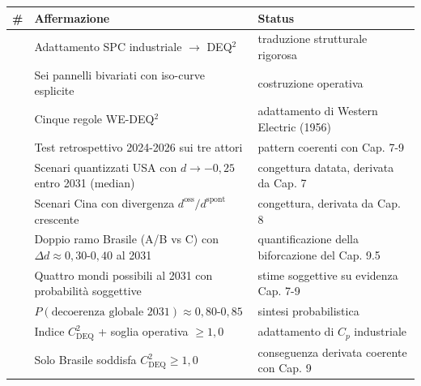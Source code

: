 {\def\LTcaptype{none} %
{\small\begin{longtable}[]{@{}
  >{\raggedright\arraybackslash}p{}
  >{\raggedright\arraybackslash}p{}
  >{\raggedright\arraybackslash}p{}@{}}
\toprule\noalign{}
\begin{minipage}[b]{\linewidth}\raggedright
\#
\end{minipage} & \begin{minipage}[b]{\linewidth}\raggedright
Affermazione
\end{minipage} & \begin{minipage}[b]{\linewidth}\raggedright
Status
\end{minipage} \\
\midrule\noalign{}
\endhead
\bottomrule\noalign{}
\endlastfoot
1 & Adattamento SPC industriale $\to$ DEQ$^2$ & \Hypoth{} traduzione
strutturale rigorosa \\
2 & Sei pannelli bivariati con iso-curve esplicite & \Hypoth{}
costruzione operativa \\
3 & Cinque regole WE-DEQ$^2$ & \Hypoth{} adattamento di Western Electric
(1956) \\
4 & Test retrospettivo 2024-2026 sui tre attori & \Proved{} pattern
coerenti con Cap. 7-9 \\
5 & Scenari quantizzati USA con \(d \to -0{,}25\) entro 2031 (median) &
\Conj{} congettura datata, derivata da Cap. 7 \\
6 & Scenari Cina con divergenza \(d^{\text{oss}}/d^{\text{spont}}\)
crescente & \Conj{} congettura, derivata da Cap. 8 \\
7 & Doppio ramo Brasile (A/B vs C) con
\(\Delta d \approx 0{,}30\)-\(0{,}40\) al 2031 & \Conj{} quantificazione
della biforcazione del Cap. 9.5 \\
8 & Quattro mondi possibili al 2031 con probabilità soggettive & \Conj{}
stime soggettive su evidenza Cap. 7-9 \\
9 & \(P(\text{decoerenza globale 2031}) \approx 0{,}80\)-\(0{,}85\) &
\Conj{} sintesi probabilistica \\
10 & Indice \(C_{\text{DEQ}}^2\) + soglia operativa \(\geq 1{,}0\) &
\Hypoth{} adattamento di \(C_p\) industriale \\
11 & Solo Brasile soddisfa \(C_{\text{DEQ}}^2 \geq 1{,}0\) & \Hypoth{}
conseguenza derivata coerente con Cap. 9 \\
\end{longtable}}
}


